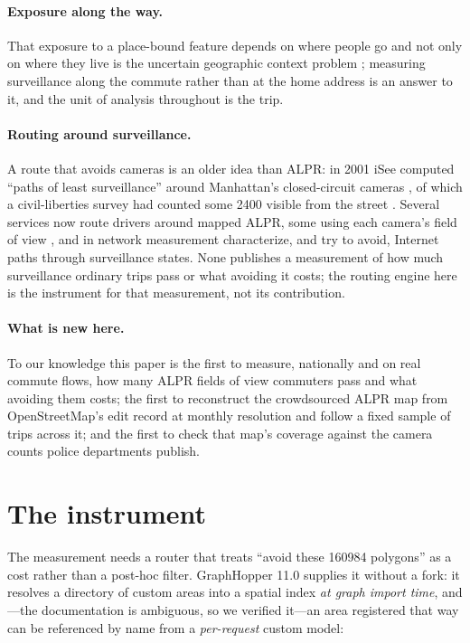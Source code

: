 \documentclass[11pt,twoside]{article}
\newcommand{\alpr}{ALPR\xspace}
\begin{document}
\paragraph{Exposure along the way.} That exposure to a place-bound feature depends on where
people go and not only on where they live is the uncertain geographic context problem
\citep{kwan2012}; measuring surveillance along the commute rather than at the home address is
an answer to it, and the unit of analysis throughout is the trip.

\paragraph{Routing around surveillance.} A route that avoids cameras is an older idea than
\alpr: in 2001 iSee computed ``paths of least surveillance'' around Manhattan's closed-circuit
cameras \citep{isee2001,schienke2002}, of which a civil-liberties survey had counted some
\num{2400} visible from the street \citep{nyclu2006}. Several services now route drivers around mapped
\alpr, some using each camera's field of view \citep{deflockmaps,flockhopper,banditkin,driversagainstflock},
and in network measurement \citet{edmundson2016} characterize, and try to avoid, Internet paths
through surveillance states. None publishes a measurement of how much surveillance ordinary
trips pass or what avoiding it costs; the routing engine here is the instrument for that
measurement, not its contribution.

\paragraph{What is new here.} To our knowledge this paper is the first to measure, nationally
and on real commute flows, how many \alpr fields of view commuters pass and what avoiding them
costs; the first to reconstruct the crowdsourced \alpr map from OpenStreetMap's edit record at
monthly resolution and follow a fixed sample of trips across it; and the first to check that
map's coverage against the camera counts police departments publish.

\section{The instrument}
\label{sec:system}

The measurement needs a router that treats ``avoid these \num{160984} polygons'' as a cost
rather than a post-hoc filter. GraphHopper 11.0 \citep{graphhopper11} supplies it without a
fork: it resolves a directory of custom areas into a spatial index \emph{at graph import
time}, and---the documentation is ambiguous, so we verified it---an area registered that way
can be referenced by name from a \emph{per-request} custom model:
\end{document}
